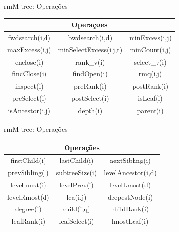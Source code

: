 \begin{frame}{rmM-tree: Operações}
    \begin{table}[]
       \begin{tabular}{|c|c|c|}
            \hline
            \multicolumn{3}{|c|}{\textbf{Operações}}  \\ \hline  
            fwdsearch(i,d)                       &bwdsearch(i,d)                        &minExcess(i,j) \\ \hline               
            maxExcess(i,j)                       & minSelectExcess(i,j,t)               & minCount(i,j)                       \\ \hline
            enclose(i)                           & rank\_v(i)                           & select\_v(i)                         \\ \hline                                
            findClose(i)                         & findOpen(i)                          & rmq(i,j) \\ \hline
            inspect(i)                           & preRank(i)                           & postRank(i)                    \\ \hline
            preSelect(i)                         & postSelect(i)                        & isLeaf(i)                       \\ \hline
            isAncestor(i,j)                      & depth(i)                             & parent(i)   \\ \hline
        \end{tabular}
    \end{table}
\end{frame}

\begin{frame}{rmM-tree: Operações}
    \begin{table}[]
        \begin{tabular}{|c|c|c|}
        \hline
        \multicolumn{3}{|c|}{\textbf{Operações}}                                                         \\ \hline
        firstChild(i) &  lastChild(i) & nextSibling(i) \\ \hline
        prevSibling(i)    & subtreeSize(i)                   & levelAncestor(i,d)         \\ \hline
        \multicolumn{1}{|c|}{level-next(i)} & levelPrev(i)  & \multicolumn{1}{c|}{levelLmost(d)} \\ \hline
        levelRmost(d)                      & lca(i,j)       & deepestNode(i)                     \\ \hline
        degree(i)                           & child(i,q)     & childRank(i)                       \\ \hline
        leafRank(i)                        & leafSelect(i) & lmostLeaf(i)                       \\ \hline
        \end{tabular}
    \end{table}
\end{frame}


